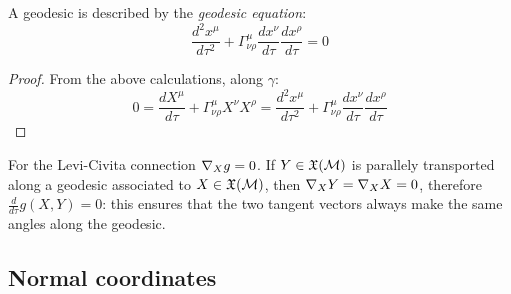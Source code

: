 \begin{proposition}
  A geodesic is described by the \textit{geodesic equation}:
  \begin{equation}
    \frac{d^2 x^\mu}{d\tau^2} + \Gamma^\mu_{\nu \rho} \frac{dx^\nu}{d\tau} \frac{dx^\rho}{d\tau} = 0
    \label{eq:3.54}
  \end{equation}
\end{proposition}
\begin{proof}
  From the above calculations, along $ \gamma $:
  \begin{equation*}
    0 = \frac{dX^\mu}{d\tau} + \Gamma^\mu_{\nu \rho} X^\nu X^\rho = \frac{d^2 x^\mu}{d\tau^2} + \Gamma^\mu_{\nu \rho} \frac{dx^\nu}{d\tau} \frac{dx^\rho}{d\tau}
  \end{equation*}
\end{proof}

For the Levi-Civita connection $ \nabla_X g = 0 $. If $ Y \in \mathfrak{X}(\mathcal{M}) $ is parallely transported along a geodesic associated to $ X \in \mathfrak{X}(\mathcal{M}) $, then $ \nabla_X Y = \nabla_X X = 0 $, therefore $ \frac{d}{d\tau} g(X,Y) = 0 $: this ensures that the two tangent vectors always make the same angles along the geodesic.

\subsection{Normal coordinates}

